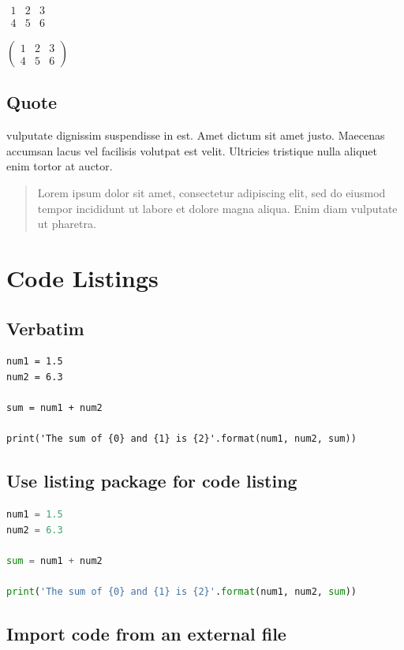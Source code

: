 \documentclass[a4paper, 12pt]{report}
\begin{document}
\vspace{.5cm}
$\begin{matrix}
1 & 2 & 3 \\
4 & 5 & 6
\end{matrix}$

$\begin{pmatrix}
1 & 2 & 3 \\
4 & 5 & 6
\end{pmatrix}$

\section{Quote}
 vulputate dignissim suspendisse in est. Amet dictum sit amet justo. Maecenas accumsan lacus vel facilisis volutpat est velit. Ultricies tristique nulla aliquet enim tortor at auctor. 
 
\begin{quote}
Lorem ipsum dolor sit amet, consectetur adipiscing elit, sed do eiusmod tempor incididunt ut labore et dolore magna aliqua. Enim diam vulputate ut pharetra.
\end{quote}



\chapter{Code Listings}
\section{Verbatim}
\begin{verbatim}
num1 = 1.5
num2 = 6.3

sum = num1 + num2

print('The sum of {0} and {1} is {2}'.format(num1, num2, sum))
\end{verbatim}

\section{Use listing package for code listing}
\begin{lstlisting}[language=Python]
num1 = 1.5
num2 = 6.3

sum = num1 + num2

print('The sum of {0} and {1} is {2}'.format(num1, num2, sum))
\end{lstlisting}

\section{Import code from an external file}

\end{document}
